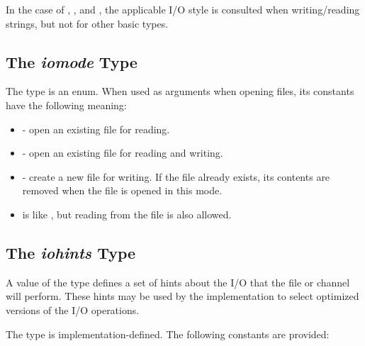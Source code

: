 In the case of , , and ,
the applicable I/O style is consulted when writing/reading
strings, but not for other basic types.


\subsection{The {\em iomode} Type}
\label{IO_iomode_type}

The  type is an enum.
When used as arguments when opening files,
its constants have the following meaning:

\begin{itemize}

\item {} - open an existing file for reading.

\item {} - open an existing file for reading and writing.

\item {} - create a new file for writing.
      If the file already exists, its contents are removed
      when the file is opened in this mode.

\item {} is like ,
      but reading from the file is also allowed.

\end{itemize}


\subsection{The {\em iohints} Type}
\label{IO_iohints_type}

A value of the  type defines a set of hints
about the I/O that the file or channel will perform.
These hints may be used by the implementation
to select optimized versions of the I/O operations.

The  type is implementation-defined.
The following  constants are provided:

